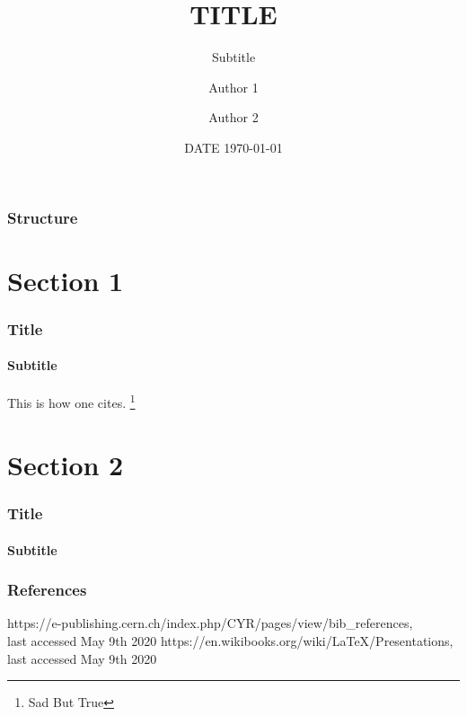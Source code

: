 \documentclass{beamer}
\title{TITLE}
\subtitle{Subtitle}
\author{Author 1 \and Author 2}
\date{DATE \today}
\begin{document}
\begin{frame}[plain]
  \titlepage
\end{frame}

\begin{frame}
  \frametitle{Structure}
  \tableofcontents%
\end{frame}

\section{Section 1}
\begin{frame}
  \frametitle{Title}
  \framesubtitle{Subtitle}
  This is how one cites. \footnote{Sad But True}

\end{frame}

\section{Section 2}
\begin{frame}
  \frametitle{Title}
  \framesubtitle{Subtitle}
\end{frame}

\begin{frame}
  \frametitle{References}
  \begin{thebibliography}{9}
     https://e-publishing.cern.ch/index.php/CYR/pages/view/bib\_references, \\ last accessed May 9th 2020
     https://en.wikibooks.org/wiki/LaTeX/Presentations, \\ last accessed May 9th 2020
  \end{thebibliography}
\end{frame}
\end{document}
